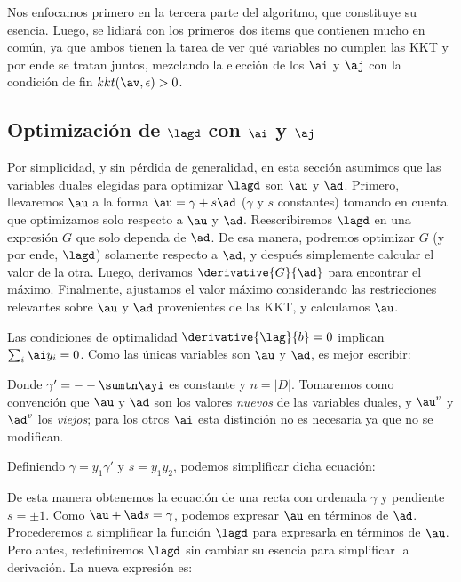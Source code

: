  Nos enfocamos primero en la tercera parte del algoritmo, que constituye su esencia. Luego, se lidiará con los primeros dos items que contienen mucho en común, ya que ambos tienen la tarea de ver qué variables no cumplen las KKT y por ende se tratan juntos, mezclando la elección de los $\ai$ y $\aj$ con la condición de fin $kkt(\av,\epsilon) > 0 $. 

\subsection[Optimización de $\lagd$]{Optimización de $\lagd$ con $\ai$ y $\aj$}



Por simplicidad, y sin pérdida de generalidad, en esta sección asumimos que las variables duales elegidas para optimizar $\lagd$ son  $\au$ y $\ad$. Primero, llevaremos $\au$ a la forma $\au = \gamma + s \ad $ ($\gamma$ y $s$ constantes) tomando en cuenta que optimizamos solo respecto a $\au$ y $\ad$. Reescribiremos $\lagd$ en una expresión $G$ que solo dependa de $\ad$. De esa manera, podremos optimizar $G$ (y por ende, $\lagd$) solamente respecto a $\ad$, y después simplemente calcular el valor de la otra. Luego, derivamos $\derivative{G}{\ad}$ para encontrar el máximo. Finalmente, ajustamos el valor máximo considerando las restricciones relevantes sobre $\au$ y $\ad$ provenientes de las KKT, y calculamos $\au$.

Las condiciones de optimalidad $\derivative{\lag}{b}=0$ implican $\sum_i \ai y_i=0$. Como las únicas variables son $\au$ y $\ad$, es mejor escribir:


Donde $\gamma'=- -\sumtn \ayi $ es constante y $n=|D|$. Tomaremos como convención que $\au$ y $\ad$ son los valores \textit{nuevos} de las variables duales, y $\au^v$ y $\ad^v$ los \textit{viejos}; para los otros $\ai$ esta distinción no es necesaria ya que no se modifican.

Definiendo $\gamma=y_1  \gamma'$ y $s=y_1 y_2$, podemos simplificar dicha ecuación:


De esta manera obtenemos la ecuación de una recta con ordenada $\gamma$ y pendiente $s=\pm 1$.  Como $\au  + \ad s = \gamma$, podemos expresar $\au$ en términos de $\ad$. Procederemos a simplificar la función $\lagd$ para expresarla en términos de $\au$. Pero antes, redefiniremos $\lagd$ sin cambiar su esencia para simplificar la derivación. La nueva expresión es:

